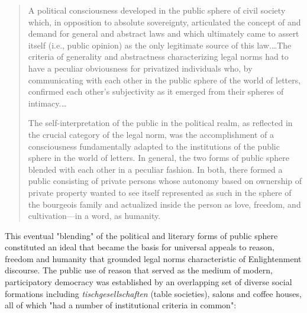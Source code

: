 \blockcquote[54--5]{Habermas1989}{
  A political consciousness developed in the public sphere of civil society which, in opposition to absolute sovereignty, articulated the concept of and demand for general and abstract laws and which ultimately came to assert itself (i.e., public opinion) as the only legitimate source of this law.…The criteria of generality and abstractness characterizing legal norms had to have a peculiar obviousness for privatized individuals who, by communicating with each other in the public sphere of the world of letters, confirmed each other's subjectivity as it emerged from their spheres of intimacy.…

  The self-interpretation of the public in the political realm, as reflected in the crucial category of the legal norm, was the accomplishment of a consciousness fundamentally adapted to the institutions of the public sphere in the world of letters. In general, the two forms of public sphere blended with each other in a peculiar fashion. In both, there formed a public consisting of private persons whose autonomy based on ownership of private property wanted to see itself represented as such in the sphere of the bourgeois family and actualized inside the person as love, freedom, and cultivation---in a word, as humanity.
}
This eventual "blending" of the political and literary forms of public sphere constituted an ideal that became the basis for universal appeals to reason, freedom and humanity that grounded legal norms characteristic of Enlightenment discourse. The public use of reason that served as the medium of modern, participatory democracy was established by an overlapping set of diverse social formations including \emph{tischgesellschaften} (table societies), salons and coffee houses, all of which "had a number of institutional criteria in common":

